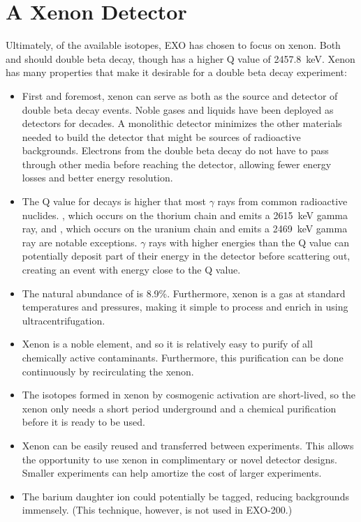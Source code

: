 \documentclass[herrin-thesis.tex]{subfiles}
\begin{document}
\section{A Xenon Detector}
Ultimately, of the available isotopes, EXO has chosen to focus on xenon. Both  and  should double beta decay, though  has a higher Q value of \SI{2457.8}{\keV}\cite{Redshaw:2007cr}. Xenon has many properties that make it desirable for a double beta decay experiment:
\begin{itemize}
\item First and foremost, xenon can serve as both as the source and detector of double beta decay events. Noble gases and liquids have been deployed as detectors for decades. A monolithic detector minimizes the other materials needed to build the detector that might be sources of radioactive backgrounds. Electrons from the double beta decay do not have to pass through other media before reaching the detector, allowing fewer energy losses and better energy resolution.
\item The Q value for  decays is higher that most \(\gamma\) rays from common radioactive nuclides. , which occurs on the thorium chain and emits a \SI{2615}{\keV} gamma ray, and , which occurs on the uranium chain and emits a \SI{2469}{\keV} gamma ray are notable exceptions. \(\gamma\) rays with higher energies than the Q value can potentially deposit part of their energy in the detector before scattering out, creating an event with energy close to the Q value.
\item The natural abundance of  is 8.9\%. Furthermore, xenon is a gas at standard temperatures and pressures, making it simple to process and enrich in  using ultracentrifugation.
\item Xenon is a noble element, and so it is relatively easy to purify of all chemically active contaminants. Furthermore, this purification can be done continuously by recirculating the xenon.
\item The isotopes formed in xenon by cosmogenic activation are short-lived, so the xenon only needs a short period underground and a chemical purification before it is ready to be used.
\item Xenon can be easily reused and transferred between experiments. This allows the opportunity to use xenon in complimentary or novel detector designs. Smaller experiments can help amortize the cost of larger experiments.
\item The barium daughter ion could potentially be tagged, reducing backgrounds immensely. (This technique, however, is not used in EXO-200.)
\end{itemize}
\end{document}
